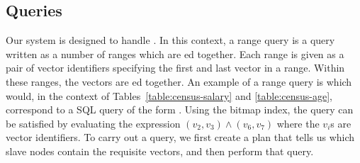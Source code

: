 \subsection{Queries}
Our system is designed to handle . In this context, a range
query is a query written as a number of ranges which are ed together.
Each range is given as a pair of vector identifiers specifying the first and
last vector in a range. Within these ranges, the vectors are ed
together. An example of a range query is  which would,
in the context of Tables~\ref{table:census-salary} and \ref{table:census-age},
correspond to a SQL query of the form
.
Using the bitmap index, the query can be satisfied by evaluating the expression
\((v_2, v_3) \land (v_6, v_7)\) where the \(v_i\)s are vector identifiers.
To carry out a query, we first create a plan that tells us which slave nodes
contain the requisite vectors, and then perform that query.
%
